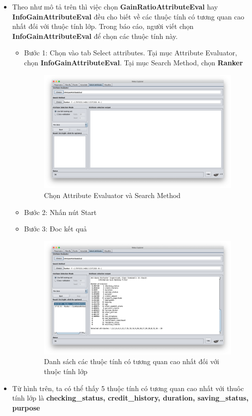 \documentclass[a4paper, 12pt]{article}
\begin{document}
\begin{itemize}
    \item Theo như mô tả trên thì việc chọn \textbf{GainRatioAttributeEval} hay \textbf{InfoGainAttributeEval} đều cho biết về các thuộc tính có tương quan cao nhất đối với thuộc tính lớp. Trong báo cáo, người viết chọn \textbf{InfoGainAttributeEval} để chọn các thuộc tính này.
    \begin{itemize}
        \item Bước 1: Chọn vào tab Select attributes. Tại mục Attribute Evaluator, chọn \textbf{InfoGainAttributeEval}. Tại mục Search Method, chọn \textbf{Ranker}
        \begin{figure}[H]
            \begin{center}
                \includegraphics[scale = 0.35]{images/selectAttributeCreditG.png}
                \caption{Chọn Attribute Evaluator và Search Method}
            \end{center}
        \end{figure}
        \item Bước 2: Nhấn nút Start
        \item Bước 3: Đoc kết quả
        \begin{figure}[H]
            \begin{center}
                \includegraphics[scale = 0.35]{images/creditG_result.png}
                \caption{Danh sách các thuộc tính có tương quan cao nhất đối với thuộc tính lớp}
            \end{center}
        \end{figure}
    \end{itemize}

    \item Từ hình trên, ta có thể thấy 5 thuộc tính có tương quan cao nhất với thuôc tính lớp là \textbf{checking\_status, credit\_history, duration, saving\_status, purpose}
\end{itemize}
\end{document}
